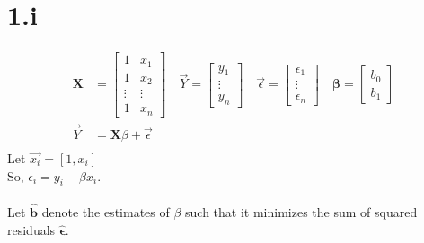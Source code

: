 \documentclass[letterpaper,12pt,titlepage,oneside,final]{book}
\newcommand{\matr}[1]{\mathbf{#1}} %
\begin{document}





\section*{1.i}
\begin{align*}
\matr{X} &= \begin{bmatrix}
    1 & x_{1} \\
    1 & x_{2} \\
    \vdots & \vdots  \\
    1  & x_{n} 
\end{bmatrix} \quad 
\vec{Y} = \begin{bmatrix}
	y_1 \\
	\vdots\\
	y_n \end{bmatrix} \quad
\vec{\epsilon} = \begin{bmatrix}
	\epsilon_1\\
	\vdots\\
	\epsilon_n 
\end{bmatrix}\quad 
\matr{\beta} = \begin{bmatrix} 
	b_0\\
	b_1
\end{bmatrix}\\
\vec{Y} &= \matr{X}\beta + \vec{\epsilon} \\
\end{align*}
Let $\vec{x_i} = [1, x_i]$ \\
So, $\epsilon_i = y_i - \beta x_i.$ \\
\\
Let $\matr{\hat{b}}$ denote the estimates of $\beta$ such that it minimizes the sum of squared residuals $\matr{\hat{\epsilon}}$.\\
\end{document}
